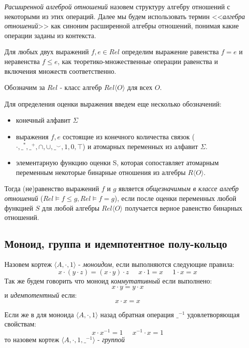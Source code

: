 \documentclass[times
              ]{itmo-student-thesis}
\begin{document}
      \textit{Расширенной алгеброй отношений} назовем структуру алгебру отношений с некоторыми из этих операций. Далее мы будем использовать термин <<\textit{алгебра отношений}>> как синоним расширенной алгебры отношений, понимая какие операции заданы из контекста.


      Для любых двух выражений $ f, e \in \mathit{Rel}$ определим выражение равенства $ f = e $ и неравенства $ f \leq e $, как теоретико-множественные операции равенства и включения множеств соответственно.

      Обозначим за $\mathit{Rel}$ - класс алгебр $ \mathit{Rel}\langle O \rangle $ для всех $ O $.

      Для определения оценки выражения введем еще несколько обозначений:
      \begin{itemize}
        \item конечный алфавит $ \Sigma $
        \item выражения $ f, e $ состоящие из конечного количества связок
        ($ \cdot, \_^*, \_^+, \cap, \cup, \_^{\smile}, 1, 0, \top $) и атомарных переменных из алфавит $ \Sigma $.
        \item элементарную функцию оценки S, которая сопоставляет атомарным переменным некоторые бинарные отношения из алгебры $ R \langle O \rangle $.
      \end{itemize}
      Тогда (не)равенство выражений $ f $ и $ g $ является \textit{общезначимым в классе алгебр отношений}
      ($\mathit{Rel} \models f \leq g, \mathit{Rel} \models f = g $),
      если после оценки переменных любой функцией $ S $ для любой алгебры $ \mathit{Rel}\langle O \rangle $ получается верное равенство бинарных отношений.

    \subsection{Моноид, группа и идемпотентное полу-кольцо}
      Назовем кортеж $ \langle A, \cdot, 1 \rangle $ - \textit{моноидом}, если выполняются следующие правила:
      $$ x \cdot (y \cdot z) = (x \cdot y) \cdot z \;\;\;\;\;
         x \cdot 1 = x \;\;\;\;\;
         1 \cdot x = x
      $$
      Так же будем говорить что моноид \textit{коммутативный} если выполнено:
      $$ x \cdot y = y \cdot x $$
      и \textit{идемпотентный} если:
      $$ x \cdot x = x $$

      Если же в для моноида $ \langle A, \cdot, 1 \rangle $ назад обратная операция $ \_^{-1} $ удовлетворяющая свойствам:
      $$ x \cdot x^{-1} = 1 \;\;\;\;\;
         x^{-1} \cdot x = 1
      $$
      то назовем кортеж $ \langle A, \cdot, 1, \_^{-1}\rangle $ - \textit{группой}
\end{document}
